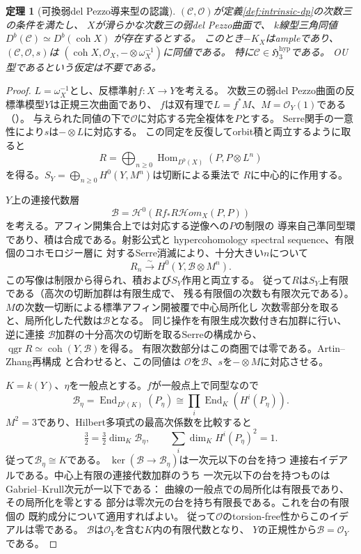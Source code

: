 \documentclass[11pt,a4paper]{ltjsarticle}
\newtheorem{theorem}{定理}[section]
\theoremstyle{definition}
\newcommand{\qgr}{\operatorname{qgr}}
\newcommand{\coh}{\operatorname{coh}}
\begin{document}
\begin{theorem}[可換弱del Pezzo導来型の認識]\label{thm:recognition-weak-commutative}
$(\mathcal C,\mathcal O)$が定義\ref{def:intrinsic-dp}の次数三の条件を満たし、
$X$が滑らかな次数三の弱del Pezzo曲面で、
$k$線型三角同値 $D^b(\mathcal C)\simeq D^b(\coh X)$ が存在するとする。
このとき$-K_X$はampleであり、
$(\mathcal C,\mathcal O,s)$は
$(\coh X,\mathcal O_X,-\otimes\omega_X^{-1})$に同値である。
特に$\mathcal C\in\mathfrak H^{\mathrm{hyp}}_3$である。
OU型であるという仮定は不要である。
\end{theorem}
\begin{proof}
$L=\omega_X^{-1}$とし、反標準射$f:X\to Y$を考える。
次数三の弱del Pezzo曲面の反標準模型$Y$は正規三次曲面であり、
$f$は双有理で$L=f^*M$、$M=\mathcal O_Y(1)$である
（\cite[Section~1]{CVGL2007}）。
与えられた同値の下で$\mathcal O$に対応する完全複体を$P$とする。
Serre関手の一意性により$s$は$-\otimes L$に対応する。
この同定を反復してorbit積と両立するように取ると
\[
 R=\bigoplus_{n\ge0}\operatorname{Hom}_{D^b(X)}(P,P\otimes L^n)
\]
を得る。$S_Y=\bigoplus_{n\ge0}H^0(Y,M^n)$は切断による乗法で
$R$に中心的に作用する。

$Y$上の連接代数層
\[
 \mathscr B=\mathcal H^0(Rf_*R\mathcal Hom_X(P,P))
\]
を考える。アフィン開集合上では対応する逆像への$P$の制限の
導来自己準同型環であり、積は合成である。射影公式と
hypercohomology spectral sequence、有限個のコホモロジー層に
対するSerre消滅により、十分大きい$n$について
\[
 R_n \xrightarrow{\sim} H^0(Y,\mathscr B\otimes M^n).
\]
この写像は制限から得られ、積および$S_Y$作用と両立する。
従って$R$は$S_Y$上有限である（高次の切断加群は有限生成で、
残る有限個の次数も有限次元である）。
$M$の次数一切断による標準アフィン開被覆で中心局所化し
次数零部分を取ると、局所化した代数は$\mathscr B$となる。
同じ操作を有限生成次数付き右加群に行い、逆に連接
$\mathscr B$加群の十分高次の切断を取るSerreの構成から、
$\qgr R\simeq\coh(Y,\mathscr B)$を得る。
有限次数部分はこの商圏では零である。Artin--Zhang再構成
\cite[Theorem~4.5]{AZ1994}と合わせると、この同値は
$\mathcal O$を$\mathscr B$、$s$を$-\otimes M$に対応させる。

$K=k(Y)$、$\eta$を一般点とする。$f$が一般点上で同型なので
\[
 \mathscr B_\eta=\operatorname{End}_{D^b(K)}(P_\eta)
   \cong\prod_i\operatorname{End}_K(H^i(P_\eta)).
\]
$M^2=3$であり、Hilbert多項式の最高次係数を比較すると
\[
 \tfrac32=\tfrac32\dim_K\mathscr B_\eta,\qquad
 \sum_i\dim_K H^i(P_\eta)^2=1.
\]
従って$\mathscr B_\eta\cong K$である。
$\ker(\mathscr B\to\mathscr B_\eta)$は一次元以下の台を持つ
連接右イデアルである。中心上有限の連接代数加群のうち
一次元以下の台を持つものはGabriel--Krull次元が一以下である：
曲線の一般点での局所化は有限長であり、その局所化を零とする
部分は零次元の台を持ち有限長である。これを台の有限個の
既約成分について適用すればよい。
従って$\mathcal O$のtorsion-free性からこのイデアルは零である。
$\mathscr B$は$\mathcal O_Y$を含む$K$内の有限代数となり、
$Y$の正規性から$\mathscr B=\mathcal O_Y$である。


\end{proof}
\end{document}
